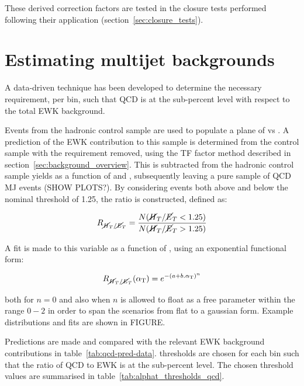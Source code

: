 These derived correction factors are tested in the closure tests performed
following their application (section~\ref{sec:closure_tests}).



\section{Estimating multijet backgrounds}  %
\label{sec:background_qcd}

A data-driven technique has been 
developed to determine the necessary \alphat requirement, per \HT bin, 
such that QCD is at the sub-percent level with respect to the total EWK 
background.

Events from the hadronic control sample are used to populate a plane of \mhtmet 
vs \alphat. A prediction of the EWK contribution to this sample is determined 
from the \mj control sample with the \mhtmet requirement removed, using the TF 
factor method described in section~\ref{sec:background_overview}. This is 
subtracted from the hadronic control sample yields as a function of \mhtmet and
\alphat, subsequently leaving a pure sample of QCD MJ events (SHOW PLOTS?).
By considering events both above and below the nominal \mhtmet threshold of
1.25, the ratio \rmhtmet is constructed, defined as:

\begin{equation}
\label{eq:rmhtmet}
R_{\cancel{H}_T / \cancel{E}_T} = \frac{N(\cancel{H}_T / \cancel{E}_T<1.25)}{N(\cancel{H}_T / \cancel{E}_T>1.25)}
\end{equation}

A fit is made to this variable as a function of \alphat, using an exponential 
functional form:

\begin{equation}
\label{eq:fit_exp}
R_{\cancel{H}_T / \cancel{E}_T}(\alpha_{\text{T}}) = e^{{-(a+b.\alpha_{\text{T}})}^n}
\end{equation}

both for $n=0$ and also when $n$ is allowed to float as a free 
parameter within the range $0-2$ in order to span the scenarios from flat to a
gaussian form. Example distributions and fits are shown in FIGURE.

Predictions are made and compared with the relevant EWK background 
contributions in table~\ref{tab:qcd-pred-data}. \alphat thresholds are chosen 
for each \HT bin such that the ratio of QCD to EWK is at the sub-percent level. 
The chosen \alphat threshold values are summarised in
table~\ref{tab:alphat_thresholds_qcd}.


